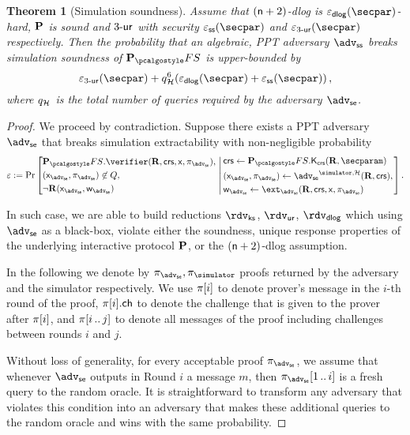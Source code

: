 \documentclass[runningheads,11pt]{llncs}
\newtheorem{theorem}{Theorem}%
\theoremstyle{definition}
\begin{document}
\begin{theorem}[Simulation soundness]
	Assume that $(\mathsf{n} + 2)$-dlog is $\eps_\dlog(\secpar)$-hard, $\mathbf{P}$ is sound and ${3\text{-}\mathsf{ur}}$ with security $\eps_{\ss}(\secpar)$ and $\eps_{\ur{3}}(\secpar)$ respectively. 
	Then the probability that an algebraic, PPT adversary $\advss$ breaks simulation soundness of $\plonkprotfs$ is upper-bounded by 
	\[
		\eps_{\ur{3}}(\secpar) + q_\ro^6 (\eps_{\dlog}(\secpar) + \eps_{\ss}(\secpar))\,,
	\]
	where $q_{\mathcal{H}}$ is the total number of queries required by the adversary $\advse$.
\end{theorem}
\begin{proof}
	We proceed by contradiction. Suppose there exists a PPT adversary $\advse$ that breaks simulation extractability with non-negligible probability
	\[
	\eps := \Pr
		\left[
		\begin{aligned}
			& \plonkprotfs.\verifier(\REL, \crs, \inp, \zkproof_{\advse}),\\
			& (\inp_{\advse}, \zkproof_{\advse}) \not\in Q,\\
			& \neg \REL(\inp_{\advse}, \wit_{\advse}) 
		\end{aligned}
		\,\left|\,
		\begin{aligned}
			& \crs \gets \plonkprotfs.\kcrs(\REL, \secparam)\\
			& (\inp_{\advse}, \zkproof_{\advse}) \gets \advse^{\simulator, \ro} (\REL, \crs),\\
			& \wit_{\advse} \gets \ext_{\advse}(\REL, \crs, \inp, \zkproof_{\advse})
		\end{aligned}
		\right.\right].
	\]

In such case, we are able to build reductions $\rdvks$, $\rdvur$, $\rdvdlog$ which using $\advse$ as a black-box, violate either the soundness, unique response properties of the underlying interactive protocol $\mathbf{P}$, or the $(\mathsf{n} + 2)$-dlog assumption.

In the following we denote by $\zkproof_{\advse}, \zkproof_{\simulator}$ proofs
returned by the adversary and the simulator respectively. We use $\pi[i]$
to denote prover's message in the $i$-th round of the proof, $\pi[i].\mathsf{ch}$
to denote the challenge that is given to the prover after $\pi[i]$, and
$\pi[i \, .. \, j]$ to denote all messages of the proof including challenges between rounds $i$ and $j$.

Without loss of generality, for every acceptable proof $\zkproof_{\advse}$, we
assume that whenever $\advse$ outputs in Round $i$ a message $m$, then
$\zkproof_{\advse}\range{1}{i}$ is a fresh query to the random oracle.
It is straightforward to transform any adversary that violates this condition into an adversary that makes these additional queries to the random oracle and wins with the same probability.


\end{proof}
\end{document}
